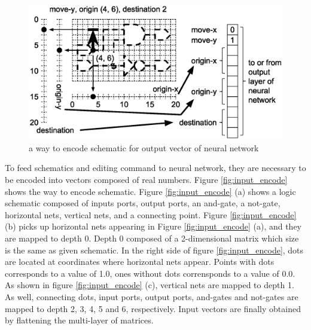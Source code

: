 \documentclass[twocolumn]{article}
\begin{document}
\begin{figure}[tb]
 \begin{center}
  \begin{minipage}{\hsize}
   \includegraphics[width=\hsize]{output_encode_02.eps}
   \caption{a way to encode schematic for output vector of neural network}
   \label{fig:output_encode}
  \end{minipage}
 \end{center}
\end{figure}

To feed schematics and editing command to neural network,
they are necessary to be encoded into vectors composed of real numbers.
Figure \ref{fig:input_encode} shows the way to encode schematic.
Figure \ref{fig:input_encode} (a) shows a logic schematic composed of
inputs ports, output ports, an and-gate, a not-gate,
horizontal nets, vertical nets, and a connecting point.
Figure \ref{fig:input_encode} (b) picks up horizontal nets appearing
in Figure \ref{fig:input_encode} (a), and they are mapped to depth 0.
Depth 0 composed of a 2-dimensional matrix which size is the same
as given schematic.
In the right side of figure \ref{fig:input_encode},
dots are located at coordinates where horizontal nets appear.
Points with dots corresponds to a value of 1.0, ones without dots
corrensponds to a value of 0.0.
As shown in figure \ref{fig:input_encode} (c),
vertical nets are mapped to depth 1.
As well, connecting dots, input ports, output ports, and-gates and not-gates
are mapped to depth 2, 3, 4, 5 and 6, respectively.
Input vectors are finally obtained by flattening the multi-layer of matrices.
\end{document}

